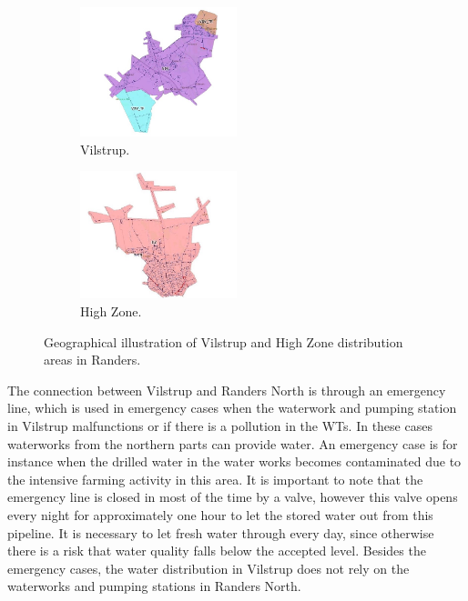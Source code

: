 \begin{figure}[H]
\centering
\begin{subfigure}{.49\textwidth}
\centering
\includegraphics[width=0.5\textwidth]{report/pictures/Vilstrup_region}
  \caption{Vilstrup.}
  \label{fig:vilstrup_region}
\end{subfigure}
\begin{subfigure}{.49\textwidth}
\centering
\includegraphics[width=0.5\textwidth]{report/pictures/Highzone_region}
  \caption{High Zone.}
  \label{fig:highzone_region}
\end{subfigure}
\caption{Geographical illustration of Vilstrup and High Zone distribution areas in Randers.}
\label{fig:vsv_hz_pic}
\end{figure}

\vspace{-3mm}


The connection between Vilstrup and Randers North is through an emergency line, which is  used in emergency cases when the waterwork and pumping station in Vilstrup malfunctions or if there is a pollution in the WTs. In these cases waterworks from the northern parts can provide water. An emergency case is for instance when the drilled water in the water works becomes contaminated due to the intensive farming activity in this area. It is important to note that the emergency line is closed in most of the time by a valve, however this valve opens every night for approximately one hour to let the stored water out from this pipeline. It is necessary to let fresh water through every day, since otherwise there is a risk that water quality falls below the accepted level. Besides the emergency cases, the  water distribution in Vilstrup does not rely on the waterworks and pumping stations in Randers North.  

